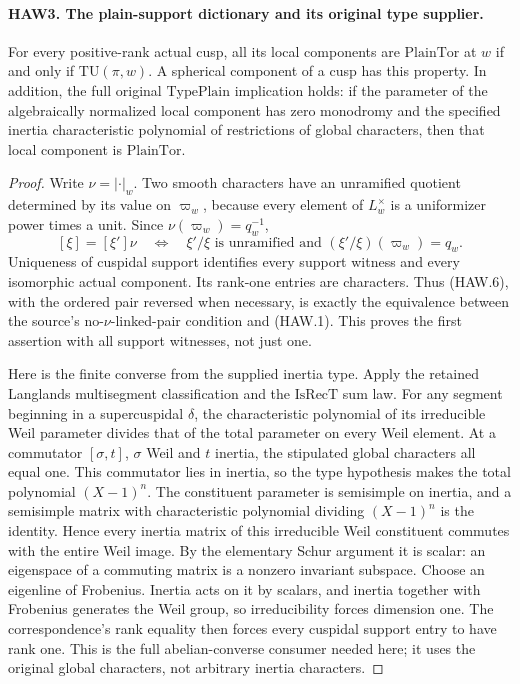 \paragraph{HAW3. The plain-support dictionary and its original type supplier.}
\label{claim:HAW3}
For every positive-rank actual cusp, all its local components
are $\mathrm{PlainTor}$ at $w$ if and only if
$\mathrm{TU}(\pi,w)$.  A spherical component of a cusp has
this property.  In addition, the full original
$\mathrm{TypePlain}$ implication holds: if the parameter of
the algebraically normalized local component has zero
monodromy and the specified inertia characteristic polynomial
of restrictions of global characters, then that local
component is $\mathrm{PlainTor}$.
\begin{proof}
Write $\nu=|\cdot|_w$.  Two smooth characters have an
unramified quotient determined by its value on $\varpi_w$,
because every element of $L_w^\times$ is a uniformizer power
times a unit.  Since $\nu(\varpi_w)=q_w^{-1}$,
\[
 [\xi]=[\xi']\nu
 \quad\Longleftrightarrow\quad
 \xi'/\xi\text{ is unramified and }
                       (\xi'/\xi)(\varpi_w)=q_w.
 \tag{HAW.6}
\]
Uniqueness of cuspidal support identifies every support witness
and every isomorphic actual component.  Its rank-one entries
are characters.  Thus (HAW.6), with the ordered pair reversed
when necessary, is exactly the equivalence between the source's
no-$\nu$-linked-pair condition and (HAW.1).  This proves the
first assertion with all support witnesses, not just one.

Here is the finite converse from the supplied inertia type.
Apply the retained Langlands multisegment classification and
the $\mathrm{IsRecT}$ sum law.  For any segment beginning in
a supercuspidal $\delta$, the characteristic polynomial of
its irreducible Weil parameter divides that of the total
parameter on every Weil element.  At a commutator
$[\sigma,t]$, $\sigma$ Weil and $t$ inertia, the stipulated
global characters all equal one.  This commutator lies in
inertia, so the type hypothesis makes the total polynomial
$(X-1)^n$.  The constituent parameter is semisimple on
inertia, and a semisimple matrix with characteristic polynomial
dividing $(X-1)^n$ is the identity.  Hence every inertia
matrix of this irreducible Weil constituent commutes with the
entire Weil image.  By the elementary Schur argument it is
scalar: an eigenspace of a commuting matrix is a nonzero
invariant subspace.  Choose an eigenline of Frobenius.  Inertia
acts on it by scalars, and inertia together with Frobenius
generates the Weil group, so irreducibility forces dimension
one.  The correspondence's rank equality then forces every
cuspidal support entry to have rank one.  This is the full
abelian-converse consumer needed here; it uses the original
global characters, not arbitrary inertia characters.


\end{proof}
